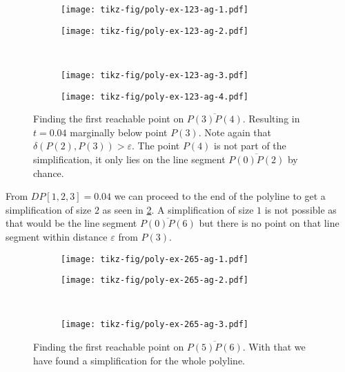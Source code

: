 \begin{figure}
  \centering
  \begin{subfigure}[b]{0.4\textwidth}
    \texttt{[image: tikz-fig/poly-ex-123-ag-1.pdf]}
  \end{subfigure}
  \begin{subfigure}[b]{0.4\textwidth}
    \texttt{[image: tikz-fig/poly-ex-123-ag-2.pdf]}
  \end{subfigure}\\
  \begin{subfigure}[b]{0.4\textwidth}
    \texttt{[image: tikz-fig/poly-ex-123-ag-3.pdf]}
  \end{subfigure}
  \begin{subfigure}[b]{0.4\textwidth}
    \texttt{[image: tikz-fig/poly-ex-123-ag-4.pdf]}
  \end{subfigure}
  \caption{Finding the first reachable point on \(\overline{P(3)P(4)}\). Resulting in \(t = 0.04\) marginally below point \(P(3)\). Note again that \(\delta(P(2), P(3)) > \varepsilon\). The point \(P(4)\) is not part of the simplification, it only lies on the line segment \(\overline{P(0)P(2)}\) by chance.}
  \label{fig:poly-ex-123-ag}
\end{figure}

From \(DP[1,2,3] = 0.04\) we can proceed to the end of the polyline to get a simplification of size \(2\) as seen in \cref{fig:poly-ex-265-ag}. A simplification of size \(1\) is not possible as that would be the line segment \(\overline{P(0)P(6)}\) but there is no point on that line segment within distance \(\varepsilon\) from \(P(3)\). 

\begin{figure}
  \centering
  \begin{subfigure}[b]{0.4\textwidth}
    \texttt{[image: tikz-fig/poly-ex-265-ag-1.pdf]}
  \end{subfigure}
  \begin{subfigure}[b]{0.4\textwidth}
    \texttt{[image: tikz-fig/poly-ex-265-ag-2.pdf]}
  \end{subfigure}\\
  \begin{subfigure}[b]{0.4\textwidth}
    \texttt{[image: tikz-fig/poly-ex-265-ag-3.pdf]}
  \end{subfigure}
  \caption{Finding the first reachable point on \(\overline{P(5)P(6)}\). With that we have found a simplification for the whole polyline.}
  \label{fig:poly-ex-265-ag}
\end{figure}

